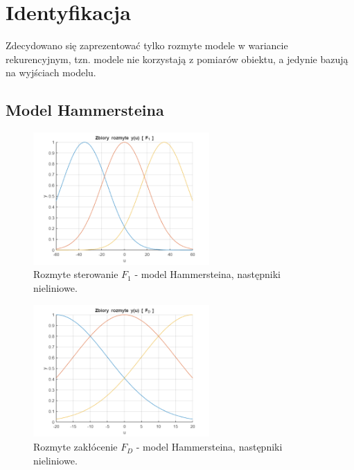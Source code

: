 \chapter{Identyfikacja}
Zdecydowano się zaprezentować tylko rozmyte modele w wariancie rekurencyjnym, tzn. modele nie korzystają z pomiarów obiektu, a jedynie bazują na wyjściach modelu.

\section{Model Hammersteina}

\begin{figure}[h!]
\centering
\includegraphics[width=0.6\textwidth]{pictures/fuzzy_hamm_f1}
\caption{Rozmyte sterowanie $F_1$ - model Hammersteina, następniki nieliniowe.}
\end{figure}

\begin{figure}[h!]
\centering
\includegraphics[width=0.6\textwidth]{pictures/fuzzy_hamm_fd}
\caption{Rozmyte zakłócenie $F_D$ - model Hammersteina, następniki nieliniowe.}
\end{figure}

\newpage

